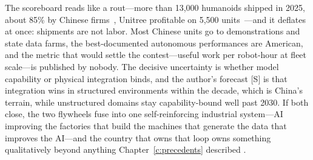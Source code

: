 The scoreboard reads like a rout---more than 13,000 humanoids shipped in 2025, about 85\% by Chinese firms~\cite{fortune-humanoid}, Unitree profitable on 5,500 units~\cite{unitree-ipo}---and it deflates at once: shipments are not labor. Most Chinese units go to demonstrations and state data farms, the best-documented autonomous performances are American, and the metric that would settle the contest---useful work per robot-hour at fleet scale---is published by nobody. The decisive uncertainty is whether model capability or physical integration binds, and the author's forecast [S] is that integration wins in structured environments within the decade, which is China's terrain, while unstructured domains stay capability-bound well past 2030. If both close, the two flywheels fuse into one self-reinforcing industrial system---AI improving the factories that build the machines that generate the data that improves the AI---and the country that owns that loop owns something qualitatively beyond anything Chapter~\ref{c:precedents} described .
